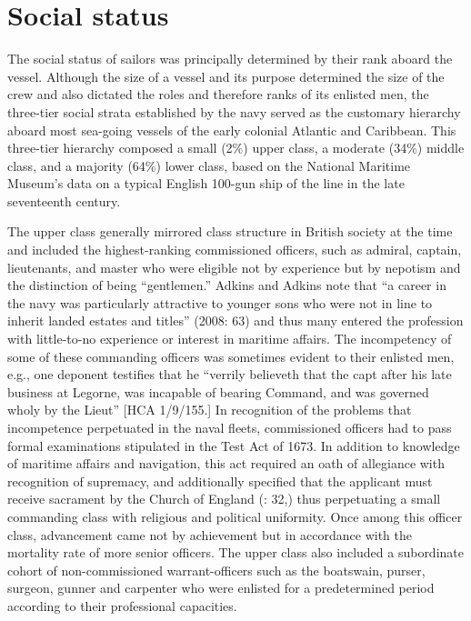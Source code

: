 \section{\textbf{Social} \textbf{status}}%

  The social status of sailors was principally determined by their rank aboard the vessel. Although the size of a vessel and its purpose determined the size of the crew and also dictated the roles and therefore ranks of its enlisted men, the three-tier social strata established by the navy served as the customary hierarchy aboard most sea-going vessels of the early colonial Atlantic and Caribbean. This three-tier hierarchy composed a small (2\%) upper class, a moderate (34\%) middle class, and a majority (64\%) lower class, based on the National Maritime Museum’s data on a typical English 100-gun ship of the line in the late seventeenth century. 

The upper class generally mirrored class structure in British society at the time and included the highest-ranking commissioned officers, such as admiral, captain, lieutenants, and master who were eligible not by experience but by nepotism and the distinction of being “gentlemen.” Adkins and Adkins note that “a career in the navy was particularly attractive to younger sons who were not in line to inherit landed estates and titles” (2008: 63) and thus many entered the profession with little-to-no experience or interest in maritime affairs. The incompetency of some of these commanding officers was sometimes evident to their enlisted men, e.g., one deponent testifies that he “verrily believeth that the capt after his late business at Legorne, was incapable of bearing Command, and was governed wholy by the Lieut” [HCA 1/9/155.] In recognition of the problems that incompetence perpetuated in the naval fleets, commissioned officers had to pass formal examinations stipulated in the Test Act of 1673. In addition to knowledge of maritime affairs and navigation, this act required an oath of allegiance with recognition of supremacy, and additionally specified that the applicant must receive sacrament by the Church of England (\citealt{AdkinsAdkins2008}: 32,) thus perpetuating a small commanding class with religious and political uniformity. Once among this officer class, advancement came not by achievement but in accordance with the mortality rate of more senior officers. The upper class also included a subordinate cohort of non-commissioned warrant-officers such as the boatswain, purser, surgeon, gunner and carpenter who were enlisted for a predetermined period according to their professional capacities.  

